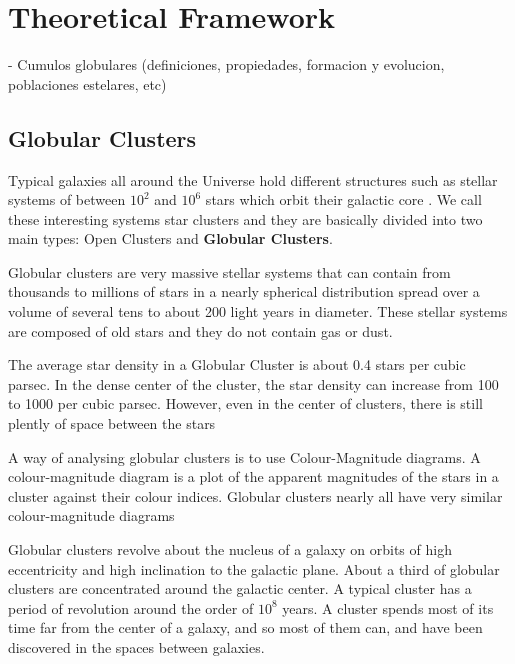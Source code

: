 \chapter{Theoretical Framework}

- Cumulos globulares (definiciones, propiedades, formacion y evolucion, poblaciones estelares, etc)

\section{Globular Clusters}

Typical galaxies all around the Universe hold different structures such as stellar systems of between $ 10^{2} $ and $ 10^{6} $ stars which orbit their galactic core . We call these interesting systems star clusters and they are basically divided into two main types: Open Clusters and \textbf{Globular Clusters}.

Globular clusters are very massive stellar systems that can contain from thousands to millions of stars in a nearly spherical distribution spread over a volume of several tens to about 200 light years in diameter. These stellar systems are composed of old stars and they do not contain gas or dust. 

The average star density in a Globular Cluster is about 0.4 stars per cubic parsec. In the dense center of the cluster, the star density can increase from 100 to 1000 per cubic parsec. However, even in the center of clusters, there is still plently of space between the stars

A way of analysing globular clusters is to use Colour-Magnitude diagrams. A colour-magnitude diagram is a plot of the apparent magnitudes of the stars in a cluster against their colour indices. Globular clusters nearly all have very similar colour-magnitude diagrams

Globular clusters revolve about the nucleus of a galaxy on orbits of high eccentricity and high inclination to the galactic plane. About a third of globular clusters are concentrated around the galactic center. A typical cluster has a period of revolution around the order of $ 10^{8} $ years. A cluster spends most of its time far from the center of a galaxy, and so most of them can, and have been discovered in the spaces between galaxies.

